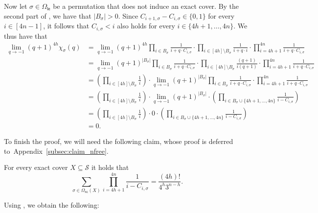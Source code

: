 \documentclass[11pt]{amsart}
\newcommand{\omxc}{\Omega_{\mathsf{xc}}}
\newcommand{\omle}{\Omega_{\mathsf{le}}}
\begin{document}
Now let $\sigma \in \omle$ be a permutation that does not induce an exact cover. By the second part of , we have that $|B_\sigma| > 0$. Since $C_{i+1, \sigma} - C_{i, \sigma} \in \{0, 1\}$ for every $i \in [4n-1]$, it follows that $C_{i, \sigma} < i$ also holds for every $i \in \{4h+1, \dots, 4n\}$. We thus have that
\begin{align*}
     \lim_{q \to -1} (q+1)^{4h}\chi_{\sigma}(q) &= \lim_{q \to -1}  (q+1)^{4h} \prod_{i \in B_\sigma} \frac{1}{i + q \cdot C_{i, \sigma}}  \cdot \prod_{i \in [4h] \setminus B_\sigma} \frac{1}{i + q \cdot i}  \cdot \prod_{i=4h+1}^{4n} \frac{1}{i + q\cdot C_{i, \sigma} }\\
      &= \lim_{q \to -1}  (q+1)^{|B_\sigma|} \prod_{i \in B_\sigma} \frac{1}{i + q \cdot C_{i, \sigma}}  \cdot \prod_{i \in [4h] \setminus B_\sigma} \frac{(q+1)}{i(q+1)}  \cdot \prod_{i=4h+1}^{4n} \frac{1}{i + q\cdot C_{i, \sigma} }\\
        &= \left(\prod_{i \in [4h] \setminus B_\sigma} \frac{1}{i}\right) \cdot \lim_{q \to -1} (q+1)^{|B_\sigma|} \prod_{i \in B_\sigma} \frac{1}{i + q \cdot C_{i, \sigma}}  \cdot \prod_{i=4h+1}^{4n} \frac{1}{i + q\cdot C_{i, \sigma} } \\
      &= \left(\prod_{i \in [4h] \setminus B_\sigma} \frac{1}{i}\right) \cdot \lim_{q \to -1}  (q+1)^{|B_\sigma|} \cdot \left(\prod_{i \in B_\sigma \cup \{4h+1, \dots, 4n\}} \frac{1}{i - C_{i, \sigma}}\right)\\
      &= \left(\prod_{i \in [4h] \setminus B_\sigma} \frac{1}{i}\right) \cdot 0 \cdot \left(\prod_{i \in B_\sigma \cup \{4h+1, \dots, 4n\}} \frac{1}{i - C_{i, \sigma}}\right)\\
      &= 0.
\end{align*}

To finish the proof, we will need the following claim, whose proof is deferred to~Appendix~\ref{subsec:claim_nfree}.
\begin{claim}\label{claim:nfree_claim}
For every exact cover $X \subseteq \mathcal{S}$ it holds that
    \[
\sum_{\sigma \in\omxc(X)} \prod_{i=4h+1}^{4n} \frac{1}{i - C_{i, \sigma}} = \frac{(4h)!}{4^h3^{n-h}}.
\]
\end{claim}

Using , we obtain the following:
\end{document}
